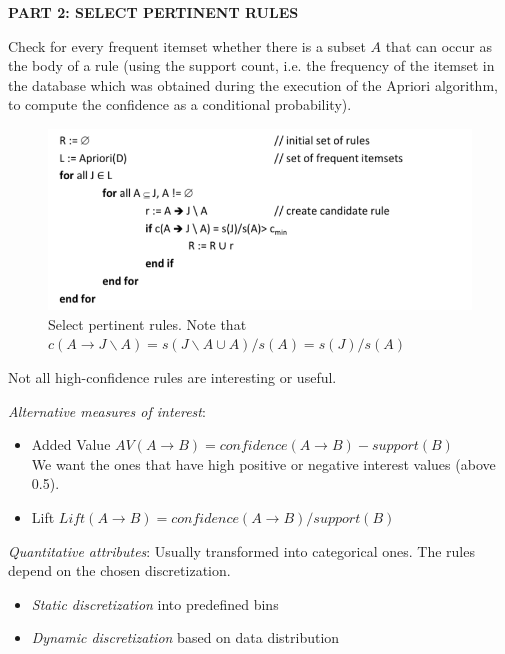    \textbf{PART 2: SELECT PERTINENT RULES}

    Check for every frequent itemset whether there is a subset $A$ that can occur as the body of a rule (using the support count, i.e. the frequency of the itemset in the database which was obtained during the execution of the Apriori algorithm, to compute the confidence as a conditional probability).

    \begin{figure}[htp]
      \centering
        \includegraphics[width=.6\textwidth]{images/sprls.png}
        \caption{Select pertinent rules. Note that $c(A\rightarrow J \backslash A) = s(J \backslash A \cup A)/s(A)=s(J)/s(A)$}
        \label{fig:sprls}
    \end{figure}

    Not all high-confidence rules are interesting or useful.

    \emph{Alternative measures of interest}:
    \begin{itemize}
      \item Added Value $AV(A\rightarrow B) = confidence(A\rightarrow B)-support(B)$\\
      We want the ones that have high positive or negative interest values (above 0.5).
      \item Lift $Lift(A\rightarrow B) = confidence(A\rightarrow B)/support(B)$
    \end{itemize}

    \emph{Quantitative attributes}: Usually transformed into categorical ones. The rules depend on the chosen discretization.
    \begin{itemize}
      \item \emph{Static discretization} into predefined bins
      \item \emph{Dynamic discretization} based on data distribution
    \end{itemize}

